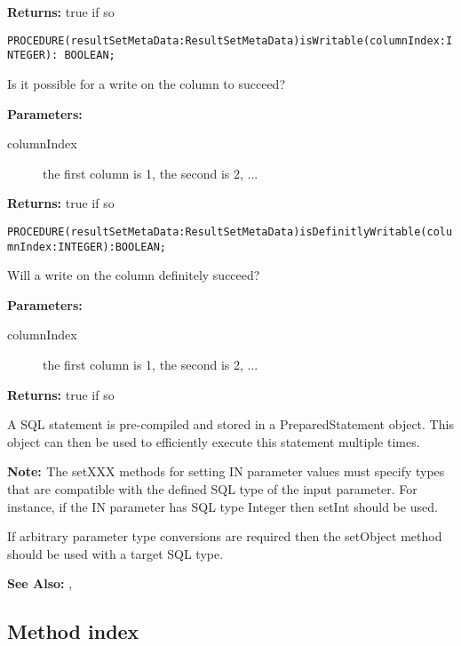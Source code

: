 {\bf Returns: } 
true if so 



\verb'PROCEDURE(resultSetMetaData:ResultSetMetaData)isWritable(columnIndex:INTEGER): BOOLEAN;'

Is it possible for a write on the column to succeed? 

{\bf Parameters: }
\begin{description}
\item[columnIndex] the first column is 1, the second is 2, ... 
\end{description}

{\bf Returns: } 
true if so 



\verb'PROCEDURE(resultSetMetaData:ResultSetMetaData)isDefinitlyWritable(columnIndex:INTEGER):BOOLEAN;'

Will a write on the column definitely succeed? 

{\bf Parameters: }
\begin{description}
\item[columnIndex] the first column is 1, the second is 2, ... 
\end{description}

{\bf Returns: } 
true if so


\renewcommand{\CurClass}{PreparedStatement}
\Class{}

A SQL statement is pre-compiled and stored in a PreparedStatement object. This object can then be used to efficiently execute this statement multiple times. 

{\bf {\bf Note: } } The setXXX methods for setting IN parameter values must specify types that are compatible with the defined SQL type of the input parameter. For instance, if the IN parameter has SQL type Integer then setInt should be used. 

If arbitrary parameter type conversions are required then the setObject method should be used with a target SQL type. 

{\bf See Also:}
, 


\subsection{Method index}

